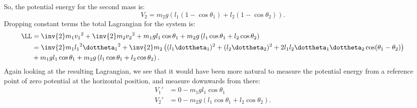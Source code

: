 {%
So, the potential energy for the second mass is:
\begin{equation}\label{eqn:tongMf1:1460}
V_2 = m_2 g \left( l_1 (1 - \cos\theta_1) + l_2 (1 - \cos\theta_2) \right).
\end{equation}
%
Dropping constant terms the total Lagrangian for the system is:
%
\begin{equation}\label{eqn:tongMf1:440}
\begin{aligned}
\LL
&= \inv{2}m_1 {v_1}^2 +\inv{2}m_2 {v_2}^2 + m_1 g l_1 \cos\theta_1 + m_2 g \left( l_1 \cos\theta_1 + l_2 \cos\theta_2 \right) \\
&=
\inv{2} m_1 {l_1}^2 {\dottheta_1}^2
+ \inv{2} m_2 \left( (l_1 \dottheta_1)^2 + (l_2 \dottheta_2)^2 + 2 l_1 l_2 \dottheta_1 \dottheta_2 \cos(\theta_1 -\theta_2) \right) \\
&+ m_1 g l_1 \cos\theta_1 + m_2 g \left( l_1 \cos\theta_1 + l_2 \cos\theta_2 \right) .
\end{aligned}
\end{equation}
%
Again looking at the resulting Lagrangian, we see that it would have been more natural to measure the potential energy from a reference point of zero potential at the horizontal position, and measure downwards from there:
%
\begin{equation}\label{eqn:tongMf1:460}
\begin{aligned}
V_1' &= 0 - m_1 g l_1 \cos\theta_1 \\
V_2' &= 0 - m_2 g \left( l_1 \cos\theta_1 + l_2 \cos\theta_2 \right).
\end{aligned}
\end{equation}
}
%
